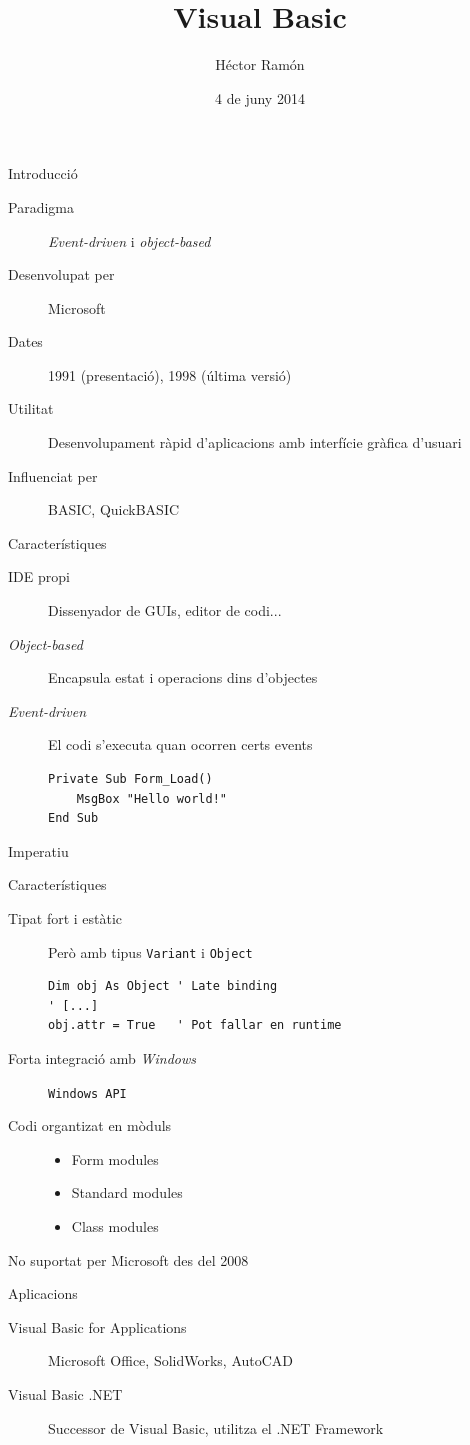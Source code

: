 \documentclass{beamer}
\title{Visual Basic}
\author{Héctor Ramón}
\date{4 de juny 2014}
\begin{document}
\frame{\titlepage}
\begin{frame}{Introducció}
\begin{description}
\item[Paradigma]
\emph{Event-driven} i \emph{object-based}
\item[Desenvolupat per]
Microsoft
\item[Dates]
1991 (presentació), 1998 (última versió)
\item[Utilitat]
Desenvolupament ràpid d'aplicacions amb interfície gràfica d'usuari
\item[Influenciat per]
BASIC, QuickBASIC
\end{description}
\end{frame}
\begin{frame}[fragile]{Característiques}
\begin{description}
\item[IDE propi]
Dissenyador de GUIs, editor de codi...
\item[\emph{Object-based}]
Encapsula estat i operacions dins d'objectes
\item[\emph{Event-driven}]
El codi s'executa quan ocorren certs events
\begin{lstlisting}[style=vbasic]
Private Sub Form_Load()
    MsgBox "Hello world!"
End Sub
\end{lstlisting}
\item[Imperatiu]
\end{description}
\end{frame}
\begin{frame}[fragile]{Característiques}
\begin{description}
\item[Tipat fort i estàtic]
Però amb tipus \texttt{Variant} i \texttt{Object}
\begin{lstlisting}[style=vbasic]
Dim obj As Object ' Late binding
' [...]
obj.attr = True   ' Pot fallar en runtime
\end{lstlisting}
\item[Forta integració amb \emph{Windows}]
\texttt{Windows API}
\item[Codi organtizat en mòduls]
\hfill
\begin{itemize}
\item
Form modules
\item
Standard modules
\item
Class modules
\end{itemize}
\item[No suportat per Microsoft des del 2008]
\end{description}
\end{frame}
\begin{frame}{Aplicacions}
\begin{description}
\item[Visual Basic for Applications]
Microsoft Office, SolidWorks, AutoCAD
\item[Visual Basic .NET]
Successor de Visual Basic, utilitza el .NET Framework
\item[]
\end{description}
\end{frame}
\end{document}
